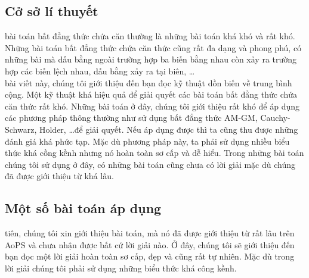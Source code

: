 {\subsection{Cở sở lí thuyết}
 bài toán bất đẳng thức chứa căn thường là những bài toán khá khó và rất khó. Những bài toán bất đẳng thức chứa căn thức cũng rất đa dạng và phong phú, có những bài mà dấu bằng ngoài trường hợp ba biến bằng nhau còn xảy ra trường hợp các biến lệch nhau, dấu bằng xảy ra tại biên, \ldots \\
 bài viết này, chúng tôi giới thiệu đến bạn đọc kỹ thuật dồn biến về trung bình cộng. Một kỹ thuật khá hiệu quả để giải quyết các bài toán bất đẳng thức chứa căn thức rất khó. Những bài toán ở đây, chúng tôi giới thiệu rất khó để áp dụng các phương pháp thông thường như sử dụng bất đẳng thức AM-GM, Cauchy- Schwarz, Holder, \ldots để giải quyết. Nếu áp dụng được thì ta cũng thu được những đánh giá khá phức tạp. Mặc dù phương pháp này, ta phải sử dụng nhiều biểu thức khá cồng kềnh nhưng nó hoàn toàn sơ cấp và dễ hiểu. Trong những bài toán chúng tôi sử dụng ở đây, có những bài toán cũng chưa có lời giải mặc dù chúng đã được giới thiệu từ khá lâu.
\subsection{Một số bài toán áp dụng}
 tiên, chúng tôi xin giới thiệu bài toán, mà nó đã được giới thiệu từ rất lâu trên AoPS và chưa nhận được bất cứ lời giải nào. Ở đây, chúng tôi sẽ giới thiệu đến bạn đọc một lời giải hoàn toàn sơ cấp, đẹp và cũng rất tự nhiên. Mặc dù trong lời giải chúng tôi phải sử dụng những biểu thức khá công kềnh.

}
